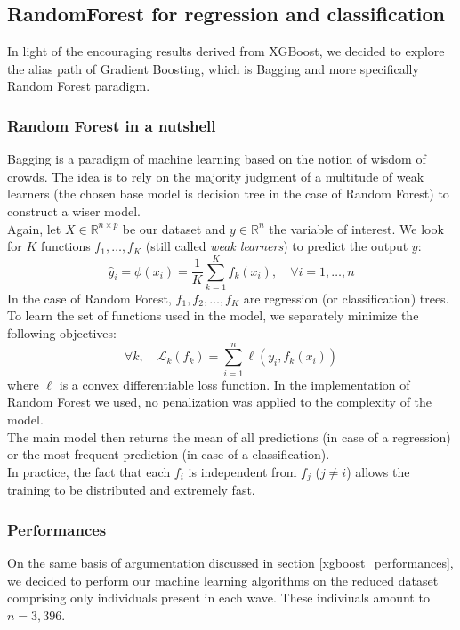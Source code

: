 \documentclass[]{article}
\begin{document}
\subsection{RandomForest for regression and classification}
In light of the encouraging results derived from XGBoost, we decided to explore the alias path of Gradient Boosting, which is Bagging and more specifically Random Forest \cite{randomForest2012} paradigm.
\subsubsection{Random Forest in a nutshell}
Bagging is a paradigm of machine learning based on the notion of wisdom of crowds. The idea is to rely on the majority judgment of a multitude of weak learners (the chosen base model is decision tree in the case of Random Forest) to construct a wiser model.\\

\noindent
Again, let $X\in \mathbb{R}^{n\times p}$ be our dataset and $y\in \mathbb{R}^n$ the variable of interest. We look for $K$ functions $f_1,\dots,f_K$ (still called \textit{weak learners}) to predict the output $y$:
\begin{equation}
	\hat{y}_i = \phi(x_i) = \frac{1}{K}\sum_{k=1}^K f_k(x_i),\quad \forall i=1, \dots, n
\end{equation}
In the case of Random Forest, $f_1,f_2,\dots,f_K$ are regression (or classification) trees.\\
To learn the set of functions used in the model, we separately minimize the following objectives:
\begin{equation}
	\label{randomForest_objective}
	\forall k, \quad \mathcal{L}_k(f_k) = \sum_{i=1}^n \ell(y_i, f_k(x_i))
\end{equation}
where $\ell$ is a convex differentiable loss function. In the implementation of Random Forest we used, no penalization was applied to the complexity of the model.\\
The main model then returns the mean of all predictions (in case of a regression) or the most frequent prediction (in case of a classification).\\

\noindent
In practice, the fact that each $f_i$ is independent from $f_j$ ($j\ne i$) allows the training to be distributed and extremely fast.
\subsubsection{Performances}
\label{randomForest_performances}
On the same basis of argumentation discussed in section \ref{xgboost_performances}, we decided to perform our machine learning algorithms on the reduced dataset comprising only individuals present in each wave. These indiviuals amount to $n = 3,396$.\\
\end{document}
